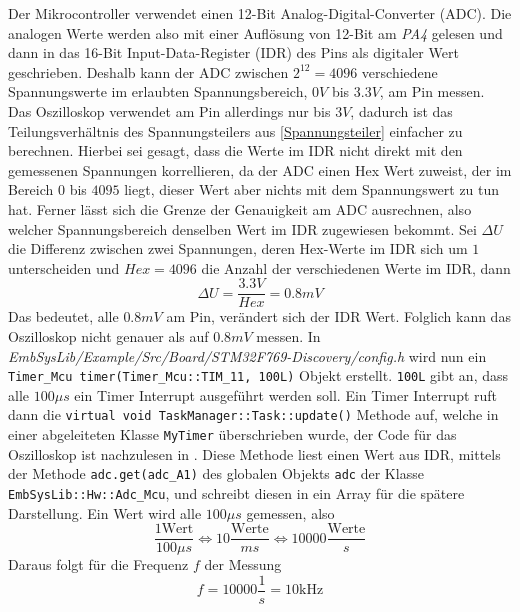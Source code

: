 Der Mikrocontroller verwendet einen 12-Bit Analog-Digital-Converter (ADC).
Die analogen Werte werden also mit einer Auflösung von 12-Bit am \textit{PA4} gelesen und dann
in das 16-Bit Input-Data-Register (IDR) des Pins als digitaler Wert
geschrieben\cite{MikroControllerDatasheet_1}.
Deshalb kann der ADC zwischen $2^{12} = 4096$ verschiedene Spannungswerte im erlaubten Spannungsbereich,
$0V$ bis $3.3V$, am Pin messen\cite{MikroControllerDatasheet_1}.
Das Oszilloskop verwendet am Pin allerdings nur bis $3V$, dadurch ist das Teilungsverhältnis des Spannungsteilers
aus \ref{Spannungsteiler} einfacher zu berechnen. \newline
Hierbei sei gesagt, dass die Werte im IDR nicht direkt mit den gemessenen Spannungen korrellieren,
da der ADC einen Hex Wert zuweist, der im Bereich $0$ bis $4095$ liegt, dieser Wert aber nichts mit
dem Spannungswert zu tun hat. \newline
Ferner lässt sich die Grenze der Genauigkeit am ADC ausrechnen, also welcher Spannungsbereich denselben
Wert im IDR zugewiesen bekommt. \newline
Sei $\Delta U$ die Differenz zwischen zwei Spannungen, deren Hex-Werte im IDR sich um $1$
unterscheiden und $Hex = 4096$ die Anzahl der verschiedenen Werte im IDR,
dann
$$\Delta U = \frac{3.3V}{Hex} = 0.8mV$$
Das bedeutet, alle $0.8mV$ am Pin, verändert sich der IDR Wert. \newline
Folglich kann das Oszilloskop nicht genauer als auf $0.8mV$ messen.
\newline \newline
In \textit{EmbSysLib/Example/Src/Board/STM32F769-Discovery/config.h} wird nun ein
\texttt{Timer\_Mcu timer(Timer\_Mcu::TIM\_11, 100L)} Objekt erstellt\cite{EmbSysLib}. \newline
\texttt{100L} gibt an, dass alle $100\mu s$ ein Timer Interrupt ausgeführt werden soll.
Ein Timer Interrupt ruft dann die \texttt{virtual void TaskManager::Task::update()} Methode auf,
welche in einer abgeleiteten Klasse \texttt{MyTimer} überschrieben wurde,
der Code für das Oszilloskop ist nachzulesen in \cite{Oscilloscope_Code}.
Diese Methode liest einen Wert aus IDR, mittels der Methode \texttt{adc.get(adc\_A1)} des
globalen Objekts \texttt{adc} der Klasse \texttt{EmbSysLib::Hw::Adc\_Mcu},
und schreibt diesen in ein Array für die spätere Darstellung. \newline
Ein Wert wird alle $100\mu s$ gemessen, also
$$
\frac{1 \text{Wert}}{100 \mu s} \iff 10\frac{\text{Werte}}{ms}
\iff 10000 \frac{\text{Werte}}{s}
$$
Daraus folgt für die Frequenz $f$ der Messung
$$
f = 10000 \frac{1}{s} = 10 \si{\kilo\hertz}
$$

